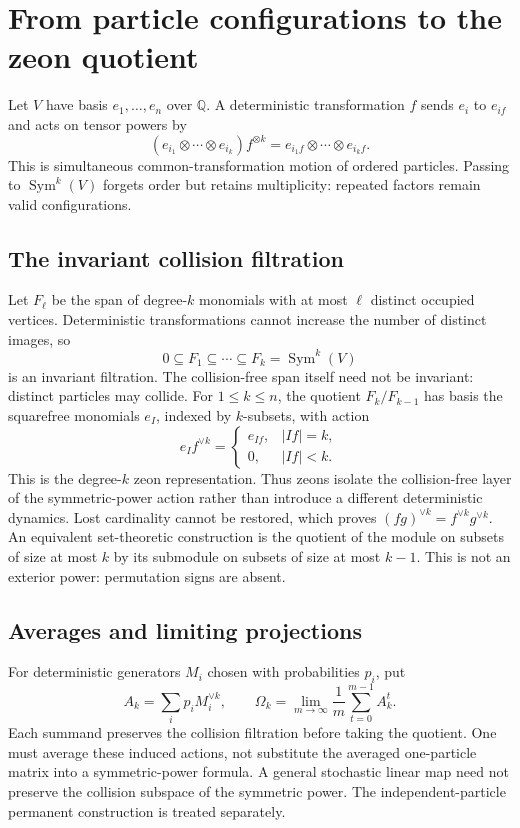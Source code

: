 \section{From particle configurations to the zeon quotient}
\label{hierarchy:collision-quotient}

Let $V$ have basis $e_1,\ldots,e_n$ over $\mathbb Q$. A deterministic
transformation $f$ sends $e_i$ to $e_{if}$ and acts on tensor powers by
\[
 (e_{i_1}\otimes\cdots\otimes e_{i_k})f^{\otimes k}
 =e_{i_1f}\otimes\cdots\otimes e_{i_kf}.
\]
This is simultaneous common-transformation motion of ordered particles.
Passing to $\operatorname{Sym}^k(V)$ forgets order but retains multiplicity:
repeated factors remain valid configurations.

\subsection{The invariant collision filtration}
Let $F_\ell$ be the span of degree-$k$ monomials with at most $\ell$
distinct occupied vertices. Deterministic transformations cannot increase
the number of distinct images, so
\[
 0\subseteq F_1\subseteq\cdots\subseteq F_k
 =\operatorname{Sym}^k(V)
\]
is an invariant filtration. The collision-free span itself need not be
invariant: distinct particles may collide. For $1\le k\le n$, the
quotient $F_k/F_{k-1}$ has basis the squarefree monomials $e_I$, indexed
by $k$-subsets, with action
\[
 e_I f^{\vee k}=\begin{cases}
 e_{If},&|If|=k,\\0,&|If|<k.
 \end{cases}
\]
This is the degree-$k$ zeon representation. Thus zeons isolate the
collision-free layer of the symmetric-power action rather than introduce
a different deterministic dynamics. Lost cardinality cannot be restored,
which proves $(fg)^{\vee k}=f^{\vee k}g^{\vee k}$.
An equivalent set-theoretic construction is the quotient of the module
on subsets of size at most $k$ by its submodule on subsets of size at most
$k-1$. This is not an exterior power: permutation signs are absent.

\subsection{Averages and limiting projections}
For deterministic generators $M_i$ chosen with probabilities $p_i$, put
\[
 A_k=\sum_i p_iM_i^{\vee k},\qquad
 \Omega_k=\lim_{m\to\infty}\frac1m\sum_{t=0}^{m-1}A_k^t.
\]
Each summand preserves the collision filtration before taking the quotient.
One must average these induced actions, not substitute the averaged
one-particle matrix into a symmetric-power formula. A general stochastic
linear map need not preserve the collision subspace of the symmetric
power. The independent-particle permanent construction is treated separately.

